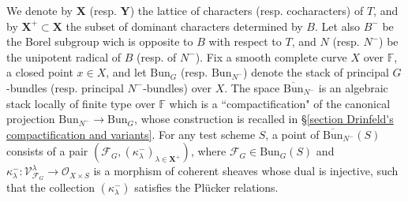 \documentclass[11pt]{amsart}
\theoremstyle{plain}
\theoremstyle{remark}
\numberwithin{equation}{section}
\begin{document}
 We denote by $\mathbf{X}$ (resp. $\mathbf{Y}$) the lattice of characters (resp. cocharacters) of $T$, and by $\mathbf{X}^+\subset\mathbf{X}$ the subset of dominant characters determined by $B$. Let also $B^-$ be the Borel subgroup wich is opposite to $B$ with respect to $T$, and $N$ (resp. $N^-$) be the unipotent radical of $B$ (resp. of $N^-$). Fix a smooth complete curve $X$ over $\mathbb{F}$, a closed point $x\in X$, and let $\mathrm{Bun}_G$ (resp. $\mathrm{Bun}_{N^-}$) denote the stack of principal $G$-bundles (resp. principal $N^-$-bundles) over $X$. The space $\overline{\mathrm{Bun}}_{N^-}$ is an algebraic stack locally of finite type over $\mathbb{F}$ which is a ``compactification" of the canonical projection $\mathrm{Bun}_{N^-}\to \mathrm{Bun}_{G}$, whose construction is recalled in §\ref{section Drinfeld's compactification and variants}. For any test scheme $S$, a point of $\overline{\mathrm{Bun}}_{N^-}(S)$ consists of a pair $(\mathcal{F}_G,(\kappa^-_\lambda)_{\lambda\in\mathbf{X}^+})$, where $\mathcal{F}_G\in \mathrm{Bun}_{G}(S)$ and $\kappa^-_\lambda:\mathcal{V}_{\mathcal{F}_G}^\lambda\to \mathcal{O}_{X\times S}$ is a morphism of coherent sheaves whose dual is injective, such that the collection $(\kappa^-_\lambda)$ satisfies the Pl\"ucker relations. 
 
\end{document}
